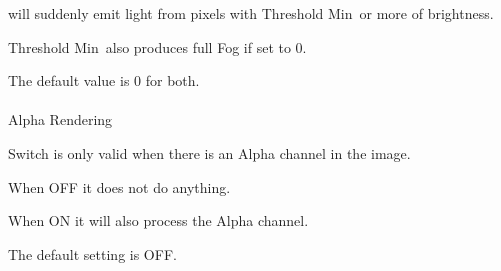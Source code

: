 \documentclass[a4paper,12pt]{article}
\begin{document}
will suddenly emit light from pixels with \textquotedbl Threshold Min\textquotedbl \ or more of brightness.\par
\textquotedbl Threshold Min\textquotedbl \ also produces full Fog if set to 0.\\
\par
The default value is 0 for both.\\
\\
Alpha Rendering\par
Switch is only valid when there is an Alpha channel in the image.\par
When OFF it does not do anything.\par
When ON it will also process the Alpha channel.\par
The default setting is OFF.
\end{document}
